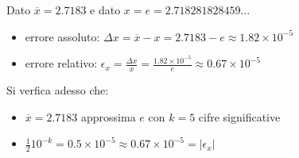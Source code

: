 \begin{center}
\footnotesize\noindent{}\end{center}

Dato \(\overline{x} = 2.7183\) e dato \(x = e = 2.718281828459\ldots \)

\begin{itemize}

\item errore assoluto: \(\Delta x = \overline{x} - x = 2.7183 - e \approx 1.82 \times 10^{-5}\)
\item errore relativo: \(\epsilon_x = \frac{\Delta x}{x} = \frac{ 1.82 \times 10^{-5}}{e} \approx 0.67 \times 10^{-5}\)

\end{itemize}

\noindent Si verfica adesso che:

\begin{itemize}
\item \(\overline{x} = 2.7183\) approssima \(e\) con \(k=5\) cifre significative
\item \( \frac{1}{2}10^{-k} = 0.5 \times 10^{-5} \approx 0.67 \times 10^{-5} = |\epsilon_x|\)
\end{itemize}
